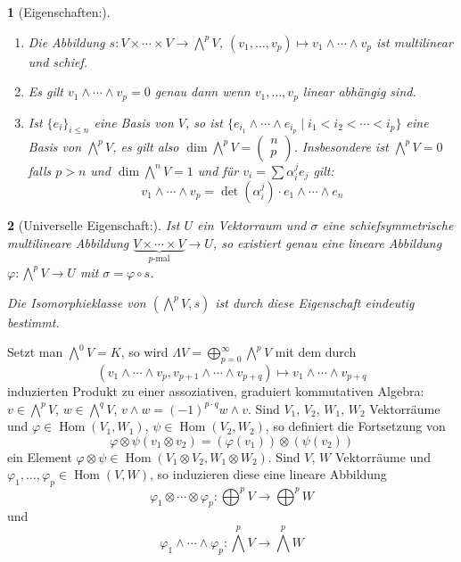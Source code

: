 \documentclass[paper=A4, twoside, chapterprefix=true, bibliography=totoc, headsepline]{scrbook}
\let\temp\phi{}
\let\phi\varphi{}
\let\varphi\temp{}
\let\temp\theta{}
\let\theta\vartheta{}
\let\vartheta\temp{}
\let\temp\epsilon{}
\let\epsilon\varepsilon{}
\let\varepsilon\temp{}
\let\temp\rho{}
\let\rho\varrho{}
\let\varrho\temp{}
\DeclareMathOperator{\Hom}{Hom}     %
\newcommand{\X}{\times}
\theoremstyle{plain}
\theoremstyle{nonumberplain}
\theoremstyle{empty}
\newtheorem{emptythm}{}%
\theoremstyle{break}
\begin{document}
\begin{emptythm}[Eigenschaften:]
  \begin{enumerate}[label=(\arabic*),leftmargin=*]
  \item Die Abbildung $s: V \X \cdots \X V \to \bigwedge^p V$, $(v_1, \ldots ,v_p) \mapsto v_1 \wedge \cdots \wedge v_p$ ist multilinear und schief.
  \item Es gilt $v_1 \wedge \cdots \wedge v_p = 0$ genau dann wenn $v_1, \ldots , v_p$ linear abh\"angig sind.
  \item Ist $\{e_i\}_{i \le n}$ eine Basis von $V$, so ist $\{e_{i_1} \wedge \cdots \wedge e_{i_p} \mid i_1 < i_2 < \cdots < i_p\}$ eine Basis von $\bigwedge^pV$, es gilt also $\dim \bigwedge^pV = \left( \begin{smallmatrix} n \\ p \end{smallmatrix} \right)$.
    Insbesondere ist $\bigwedge^pV = 0$ falls $p > n$ und $\dim \bigwedge^nV = 1$ und f\"ur $v_i = \sum \alpha_i^j e_j$ gilt:
    \[ v_1 \wedge \cdots \wedge v_p = \det (\alpha_i^j) \cdot e_1 \wedge \cdots \wedge e_n \]
  \end{enumerate}
\end{emptythm}

\begin{emptythm}[Universelle Eigenschaft:]
Ist $U$ ein Vektorraum und $\sigma$ eine schiefsymmetrische multilineare Abbildung $\underbrace{V \X \cdots \X V}_{p\text{-mal}} \to U$, so existiert genau eine lineare Abbildung $\phi: \bigwedge^pV \to U$ mit $\sigma = \phi \circ s$.
\begin{center}\end{center}
Die Isomorphieklasse von $(\bigwedge^pV, s)$ ist durch diese Eigenschaft eindeutig bestimmt.
\end{emptythm}

Setzt man $\bigwedge^0V = K$, so wird $\Lambda V = \bigoplus_{p=0}^{\infty}\bigwedge^pV$ mit dem durch
	\[ (v_1 \wedge \cdots \wedge v_p, v_{p+1} \wedge \cdots \wedge v_{p+q}) \mapsto v_1 \wedge \cdots \wedge v_{p+q} \]
induzierten Produkt zu einer assoziativen, graduiert kommutativen Algebra: $v \in \bigwedge^pV$, $w \in \bigwedge^qV$, $v \wedge w = (-1)^{p \cdot q} w \wedge v$. Sind $V_1$, $V_2$, $W_1$, $W_2$ Vektorr\"aume und $\phi \in \Hom(V_1, W_1)$, $\psi \in \Hom(V_2, W_2)$, so definiert die Fortsetzung von 
	\[ \phi \otimes \psi (v_1 \otimes v_2) = (\phi(v_1)) \otimes (\psi(v_2)) \]
ein Element $\phi \otimes \psi \in \Hom(V_1 \otimes V_2, W_1 \otimes W_2)$. Sind $V$, $W$ Vektorr\"aume und $\phi_1,\ldots ,\phi_p \in \Hom(V, W)$, so induzieren diese eine lineare Abbildung
	\[ \phi_1 \otimes \cdots \otimes \phi_p : \bigoplus^p V \to \bigoplus^p W \]
und
	\[ \phi_1 \wedge \cdots  \wedge \phi_p : \bigwedge^pV \to \bigwedge^pW \]
\end{document}
